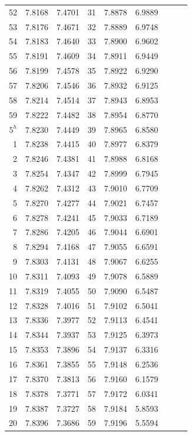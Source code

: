 \documentclass[10pt,a4paper]{article}
\begin{document}
\begin{center}
\begin{longtable}{@{}r@{\hspace{0.8em}}r@{\hspace{0.8em}}r@{\hspace{1.5em}}r@{\hspace{0.8em}}r@{\hspace{0.8em}}r@{\hspace{1.5em}}r@{\hspace{0.8em}}r@{\hspace{0.8em}}r@{}}
52 & 7.8168 & 7.4701 & 31 & 7.8878 & 6.9889 & & & \\
53 & 7.8176 & 7.4671 & 32 & 7.8889 & 6.9748 & & & \\
54 & 7.8183 & 7.4640 & 33 & 7.8900 & 6.9602 & & & \\
55 & 7.8191 & 7.4609 & 34 & 7.8911 & 6.9449 & & & \\
56 & 7.8199 & 7.4578 & 35 & 7.8922 & 6.9290 & & & \\
57 & 7.8206 & 7.4546 & 36 & 7.8932 & 6.9125 & & & \\
58 & 7.8214 & 7.4514 & 37 & 7.8943 & 6.8953 & & & \\
59 & 7.8222 & 7.4482 & 38 & 7.8954 & 6.8770 & & & \\
$5^h$ & 7.8230 & 7.4449 & 39 & 7.8965 & 6.8580 & & & \\
1 & 7.8238 & 7.4415 & 40 & 7.8977 & 6.8379 & & & \\
2 & 7.8246 & 7.4381 & 41 & 7.8988 & 6.8168 & & & \\
3 & 7.8254 & 7.4347 & 42 & 7.8999 & 6.7945 & & & \\
4 & 7.8262 & 7.4312 & 43 & 7.9010 & 6.7709 & & & \\
5 & 7.8270 & 7.4277 & 44 & 7.9021 & 6.7457 & & & \\
6 & 7.8278 & 7.4241 & 45 & 7.9033 & 6.7189 & & & \\
7 & 7.8286 & 7.4205 & 46 & 7.9044 & 6.6901 & & & \\
8 & 7.8294 & 7.4168 & 47 & 7.9055 & 6.6591 & & & \\
9 & 7.8303 & 7.4131 & 48 & 7.9067 & 6.6255 & & & \\
10 & 7.8311 & 7.4093 & 49 & 7.9078 & 6.5889 & & & \\
11 & 7.8319 & 7.4055 & 50 & 7.9090 & 6.5487 & & & \\
12 & 7.8328 & 7.4016 & 51 & 7.9102 & 6.5041 & & & \\
13 & 7.8336 & 7.3977 & 52 & 7.9113 & 6.4541 & & & \\
14 & 7.8344 & 7.3937 & 53 & 7.9125 & 6.3973 & & & \\
15 & 7.8353 & 7.3896 & 54 & 7.9137 & 6.3316 & & & \\
16 & 7.8361 & 7.3855 & 55 & 7.9148 & 6.2536 & & & \\
17 & 7.8370 & 7.3813 & 56 & 7.9160 & 6.1579 & & & \\
18 & 7.8378 & 7.3771 & 57 & 7.9172 & 6.0341 & & & \\
19 & 7.8387 & 7.3727 & 58 & 7.9184 & 5.8593 & & & \\
20 & 7.8396 & 7.3686 & 59 & 7.9196 & 5.5594 & & & \\
\end{longtable}
\end{center}
\end{document}
